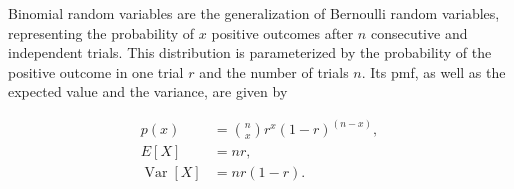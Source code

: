 Binomial random variables are the generalization of Bernoulli random variables,
representing the probability of $x$ positive outcomes after $n$ consecutive and
independent trials. This distribution is parameterized by the probability of the
positive outcome in one trial $r$ and the number of trials $n$. Its pmf, as well 
as the expected value and the variance, are given by

$$
\begin{aligned}
    p(x) &= \binom{n}{x} r^x (1-r)^{(n-x)}, \\
    E[X] &= nr, \\
    \operatorname{Var}[X] &= nr(1-r).
\end{aligned}
$$
